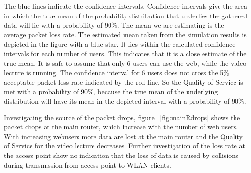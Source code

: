 \documentclass[a4paper,10pt]{book}\usepackage{graphicx}
\begin{document}
The blue lines indicate the confidence intervals. Confidence intervals give the area in which 
the true mean of the probability distribution that underlies the gathered data will lie with a probability of 90$\%$.
The mean we are estimating is the average packet loss rate. The estimated mean taken from the simulation results is depicted in the figure with a blue star.
It lies within the calculated confidence intervals for each number of users. This indicates that it is a close estimate of the true mean.
It is safe to assume that only 6 users can use the web, while the video lecture is running.
The confidence interval for 6 users does not cross the 5$\%$ acceptable packet loss 
rate indicated by the red line. So the Quality of Service is met with a probability of 90$\%$, because the true mean of the
underlying distribution will have its mean in the depicted interval with a probability of 90$\%$.

Investigating the source of the packet drops, figure ~\ref{fig:mainRdrops} shows the packet drops at the main router, which increase with the number of 
web users. With increasing webusers more data are lost at the main router and the Quality of Service for the video lecture decreases.
Further investigation of the loss rate at the access point show no indication that 
the loss of data is caused by collisions during transmission from access point to WLAN clients.
\end{document}
